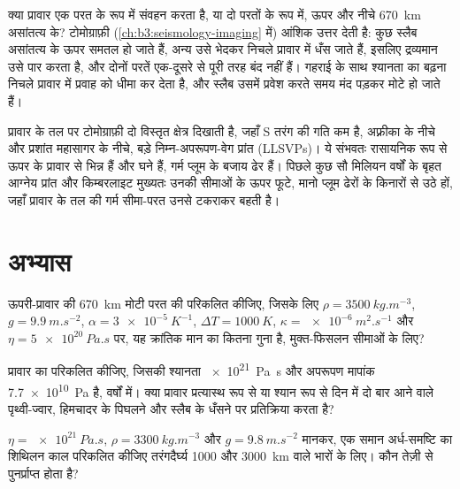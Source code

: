 क्या प्रावार एक परत के रूप में संवहन करता है, या दो परतों के रूप में, ऊपर और
नीचे \qty{670}{km} असांतत्य के? टोमोग्राफ़ी (\cref{ch:b3:seismology-imaging} में) आंशिक उत्तर देती है:
कुछ स्लैब असांतत्य के ऊपर समतल हो जाते हैं, अन्य उसे भेदकर निचले प्रावार में धँस जाते हैं,
इसलिए द्रव्यमान उसे पार करता है, और दोनों परतें एक-दूसरे से पूरी तरह बंद नहीं हैं।
गहराई के साथ श्यानता का बढ़ना निचले प्रावार में प्रवाह को धीमा कर देता है,
और स्लैब उसमें प्रवेश करते समय मंद पड़कर मोटे हो जाते हैं।

प्रावार के तल पर टोमोग्राफ़ी दो विस्तृत क्षेत्र दिखाती है, जहाँ S तरंग की गति कम है,
अफ़्रीका के नीचे और प्रशांत महासागर के नीचे, बड़े निम्न-अपरूपण-वेग
प्रांत (LLSVPs)। ये संभवतः रासायनिक रूप से ऊपर के प्रावार से भिन्न हैं
और घने हैं, गर्म प्लूम के बजाय ढेर हैं। पिछले कुछ सौ मिलियन वर्षों के बृहत आग्नेय प्रांत और
किम्बरलाइट मुख्यतः उनकी सीमाओं के ऊपर फूटे,
मानो प्लूम ढेरों के किनारों से उठे हों, जहाँ प्रावार के तल की गर्म
सीमा-परत उनसे टकराकर बहती है।

\section{अभ्यास}

\begin{exercise}[$\star$]\label{exo:b3:mantle-convection:1}
ऊपरी-प्रावार की \qty{670}{km} मोटी परत की  परिकलित कीजिए, जिसके लिए
$\rho = \qty{3500}{kg.m^{-3}}$, $g = \qty{9.9}{m.s^{-2}}$, $\alpha =
\qty{3e-5}{K^{-1}}$, $\Delta T = \qty{1000}{K}$, $\kappa =
\qty{e-6}{m^2.s^{-1}}$ और $\eta = \qty{5e20}{Pa.s}$ पर, यह क्रांतिक मान का कितना गुना है,
मुक्त-फिसलन सीमाओं के लिए?
\end{exercise}

\begin{exercise}[$\star$]\label{exo:b3:mantle-convection:2}
प्रावार का  परिकलित कीजिए, जिसकी श्यानता \qty{e21}{Pa.s} और अपरूपण
मापांक \qty{7.7e10}{Pa} है, वर्षों में। क्या प्रावार प्रत्यास्थ रूप से या श्यान रूप से
दिन में दो बार आने वाले पृथ्वी-ज्वार, हिमचादर के पिघलने और
स्लैब के धँसने पर प्रतिक्रिया करता है?
\end{exercise}

\begin{exercise}[$\star$]\label{exo:b3:mantle-convection:3}
$\eta = \qty{e21}{Pa.s}$, $\rho = \qty{3300}{kg.m^{-3}}$ और $g =
\qty{9.8}{m.s^{-2}}$ मानकर, एक समान अर्ध-समष्टि का शिथिलन काल परिकलित कीजिए
तरंगदैर्घ्य 1000 और \qty{3000}{km} वाले भारों के लिए। कौन तेज़ी से पुनर्प्राप्त होता है?
\end{exercise}

